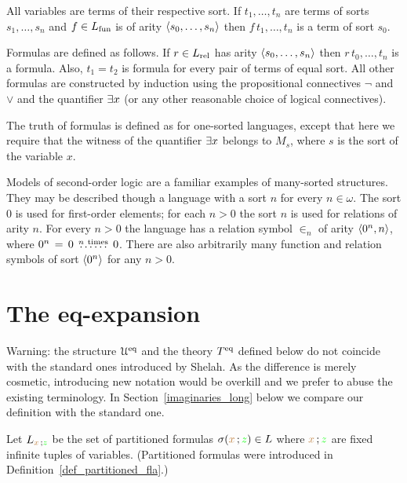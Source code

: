 \documentclass[creche.tex]{subfiles}
\begin{document}
All variables are terms of their respective sort.
If $t_1,\dots,t_n$ are terms of sorts $s_1,\dots,s_n$ and $f\in L_{\rm fun}$ is of arity $\langle s_0,\dots,s_n\rangle$ then $f\,t_1,\dots,t_n$ is a term of sort $s_0$.

Formulas are defined as follows.
If $r\in L_{\rm rel}$ has arity $\langle s_0,\dots,s_n\rangle$ then $r\,t_0,\dots,t_n$ is a formula.
Also, $t_1=t_2$ is formula for every pair of terms of equal sort.
All other formulas are constructed by induction using the propositional connectives $\neg$ and $\vee$ and the quantifier $\exists x$ (or any other reasonable choice of logical connectives).

The truth of formulas is defined as for one-sorted languages, except that here we require that the witness of the quantifier $\exists x$ belongs to $M_s$, where $s$ is the sort of the variable $x$.

Models of second-order logic are a familiar examples of many-sorted structures.
They may be described though a language with a sort $n$ for every $n\in\omega$.
The sort $0$ is used for first-order elements; for each $n>0$ the sort $n$ is used for relations of arity $n$.
For every $n>0$ the language has a relation symbol $\in_n$ of arity $\langle0^n,n\rangle$, where $0^n\,=\, 0\,\stackrel{n\ \rm times}{\dots\dots}\,0$.
%
%
There are also arbitrarily many function and relation symbols of sort $\langle0^n\rangle$ for any $n>0$.

\section{The eq-expansion}\label{immaginari}

\noindent\llap{\textcolor{red}{\Large\danger}\kern1.5ex}Warning: the structure $\EuScript U^{{\rm eq}}$ and the theory $T^{{\rm eq}}$ defined below do not coincide with the standard ones introduced by Shelah.
As the difference is merely cosmetic, introducing new notation would be overkill and we prefer to abuse the existing terminology.
In Section~\ref{imaginaries_long} below we compare our definition with the standard one.

Let $L_{{\color{brown} x}\,;{\color{green} z}}$ be the set of partitioned formulas  $\sigma({\color{brown} x}\,;{\color{green} z})\in L$ where ${\color{brown} x}\,;{\color{green} z}$ are fixed infinite tuples of variables.
(Partitioned formulas were introduced in Definition~\ref{def_partitioned_fla}.)
\end{document}
